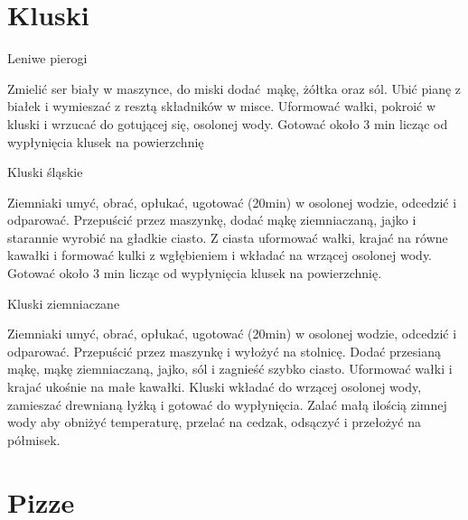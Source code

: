 \documentclass[a4paper,12pt]{article}
\begin{document}
\newpage

\section{Kluski}

\begin{recipe}{Leniwe pierogi}{}{}

Zmielić ser biały w maszynce, do miski dodać mąkę, żółtka oraz sól. Ubić pianę z białek
i wymieszać z resztą składników w misce. Uformować wałki, pokroić w kluski i
wrzucać do gotującej się, osolonej wody.
Gotować około 3 min licząc od wypłynięcia klusek na powierzchnię 

\end{recipe}

\begin{recipe}{Kluski śląskie}{}{}

Ziemniaki umyć, obrać, opłukać, ugotować (20min) w osolonej wodzie, odcedzić i
odparować. Przepuścić przez maszynkę, dodać mąkę ziemniaczaną, jajko i
starannie wyrobić na gładkie ciasto.
\freeform%
Z ciasta uformować wałki, krajać na równe
kawałki i formować kulki z wgłębieniem i wkładać na wrzącej osolonej wody.
Gotować około 3 min licząc od wypłynięcia klusek na powierzchnię. 

\end{recipe}


\begin{recipe}{Kluski ziemniaczane}{}{}

Ziemniaki umyć, obrać, opłukać, ugotować (20min) w osolonej wodzie, odcedzić i
odparować. Przepuścić przez maszynkę i wyłożyć na stolnicę. Dodać przesianą
mąkę, mąkę ziemniaczaną, jajko, sól i zagnieść szybko ciasto.
\freeform%
Uformować wałki i
krajać ukośnie na małe kawałki. Kluski wkładać do wrzącej osolonej wody,
zamieszać drewnianą łyżką i gotować do wypłynięcia. Zalać małą ilością zimnej
wody aby obniżyć temperaturę, przelać na cedzak, odsączyć i przełożyć na
półmisek.

\end{recipe}


\newpage
\section{Pizze}
\end{document}
